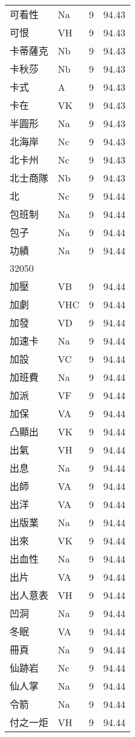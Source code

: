 \documentclass[twocolumn]{book}
\begin{document}
\begin{supertabular}{llrr}
可看性 & Na & 9 &  94.43\\
可恨 & VH & 9 &  94.43\\
卡蒂薩克 & Nb & 9 &  94.43\\
卡秋莎 & Nb & 9 &  94.43\\
卡式 & A & 9 &  94.43\\
卡在 & VK & 9 &  94.43\\
半圓形 & Na & 9 &  94.43\\
北海岸 & Nc & 9 &  94.43\\
北卡州 & Nc & 9 &  94.43\\
北士商隊 & Nb & 9 &  94.43\\
北 & Nc & 9 &  94.44\\
包班制 & Na & 9 &  94.44\\
包子 & Na & 9 &  94.44\\
功績 & Na & 9 &  94.44\\
32050\\
加壓 & VB & 9 &  94.44\\
加劇 & VHC & 9 &  94.44\\
加發 & VD & 9 &  94.44\\
加速卡 & Na & 9 &  94.44\\
加設 & VC & 9 &  94.44\\
加班費 & Na & 9 &  94.44\\
加派 & VF & 9 &  94.44\\
加保 & VA & 9 &  94.44\\
凸顯出 & VK & 9 &  94.44\\
出氣 & VH & 9 &  94.44\\
出息 & Na & 9 &  94.44\\
出師 & VA & 9 &  94.44\\
出洋 & VA & 9 &  94.44\\
出版業 & Na & 9 &  94.44\\
出來 & VK & 9 &  94.44\\
出血性 & Na & 9 &  94.44\\
出片 & VA & 9 &  94.44\\
出人意表 & VH & 9 &  94.44\\
凹洞 & Na & 9 &  94.44\\
冬眠 & VA & 9 &  94.44\\
冊頁 & Na & 9 &  94.44\\
仙跡岩 & Nc & 9 &  94.44\\
仙人掌 & Na & 9 &  94.44\\
令箭 & Na & 9 &  94.44\\
付之一炬 & VH & 9 &  94.44\\

\end{supertabular}
\end{document}
